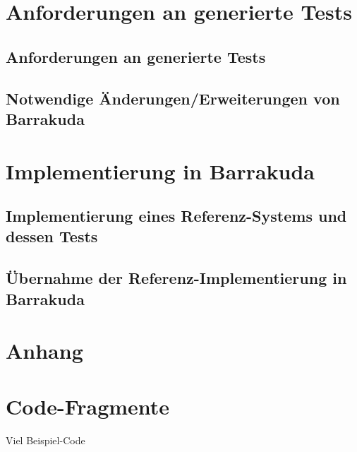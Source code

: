 \documentclass[12pt,a4paper,bibliography=totocnumbered,listof=totocnumbered]{scrartcl}
\begin{document}
\section{Anforderungen an generierte Tests}

\subsection{Anforderungen an generierte Tests}

\subsection{Notwendige Änderungen/Erweiterungen von Barrakuda}

\section{Implementierung in Barrakuda}

\subsection{Implementierung eines Referenz-Systems und dessen Tests}

\subsection{Übernahme der Referenz-Implementierung in Barrakuda}

\renewcommand\refname{Quellenverzeichnis}


\pagebreak

\setcounter{page}{1}

\begin{appendix}
\section*{Anhang}
{}

\section{Code-Fragmente}
Viel Beispiel-Code

\end{appendix}
\end{document}
